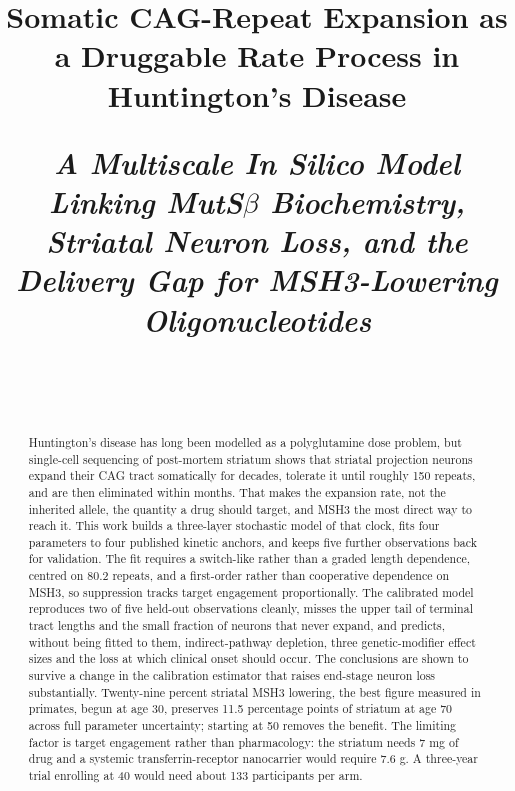 \documentclass[conference]{IEEEtran}
\begin{document}
\title{Somatic CAG-Repeat Expansion as a Druggable Rate Process in
Huntington's Disease\\[0.7\baselineskip]
\parbox{0.88\textwidth}{\centering\large\itshape A Multiscale In Silico Model
Linking MutS$\beta$ Biochemistry, Striatal Neuron Loss, and the Delivery Gap
for MSH3-Lowering Oligonucleotides\par}\\[0.25\baselineskip]}

\author{
}

\maketitle

\begin{abstract}
Huntington's disease has long been modelled as a polyglutamine dose problem, but single-cell sequencing of post-mortem striatum shows that striatal projection neurons expand their CAG tract somatically for decades, tolerate it until roughly 150 repeats, and are then eliminated within months. That makes the expansion rate, not the inherited allele, the quantity a drug should target, and MSH3 the most direct way to reach it. This work builds a three-layer stochastic model of that clock, fits four parameters to four published kinetic anchors, and keeps five further observations back for validation. The fit requires a switch-like rather than a graded length dependence, centred on 80.2 repeats, and a first-order rather than cooperative dependence on MSH3, so suppression tracks target engagement proportionally. The calibrated model reproduces two of five held-out observations cleanly, misses the upper tail of terminal tract lengths and the small fraction of neurons that never expand, and predicts, without being fitted to them, indirect-pathway depletion, three genetic-modifier effect sizes and the loss at which clinical onset should occur. The conclusions are shown to survive a change in the calibration estimator that raises end-stage neuron loss substantially. Twenty-nine percent striatal MSH3 lowering, the best figure measured in primates, begun at age 30, preserves 11.5 percentage points of striatum at age 70 across full parameter uncertainty; starting at 50 removes the benefit. The limiting factor is target engagement rather than pharmacology: the striatum needs 7 mg of drug and a systemic transferrin-receptor nanocarrier would require 7.6 g. A three-year trial enrolling at 40 would need about 133 participants per arm.
\end{abstract}
\end{document}
